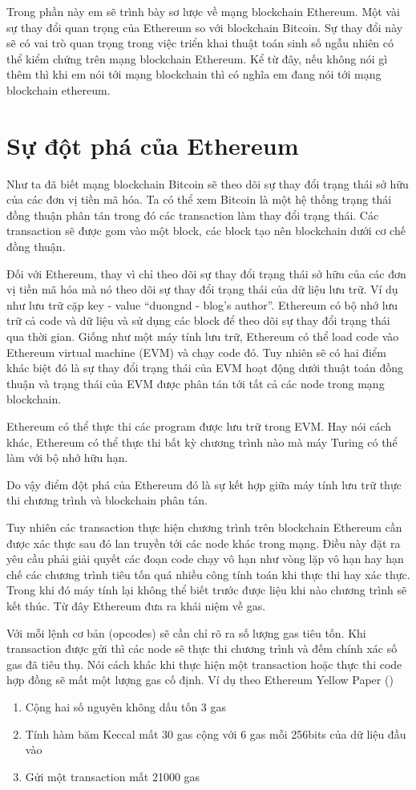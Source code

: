 \documentclass[../main.tex]{subfiles}
\begin{document}
Trong phần này em sẽ trình bày sơ lược về mạng blockchain Ethereum. Một vài sự thay đổi quan trọng của Ethereum so với blockchain Bitcoin. Sự thay đổi này sẽ có vai trò quan trọng trong việc triển khai thuật toán sinh số ngẫu nhiên có thể kiểm chứng trên mạng blockchain Ethereum. Kể từ đây, nếu không nói gì thêm thì khi em nói tới mạng blockchain thì có nghĩa em đang nói tới mạng blockchain ethereum. 

\section{Sự đột phá của Ethereum}
Như ta đã biết mạng blockchain Bitcoin sẽ theo dõi sự thay đổi trạng thái sở hữu của các đơn vị tiền mã hóa. Ta có thể xem Bitcoin là một hệ thống trạng thái đồng thuận phân tán trong đó các transaction  làm thay đổi trạng thái.  Các transaction sẽ được gom vào một block, các block tạo nên blockchain dưới cơ chế đồng thuận.

Đối với Ethereum, thay vì chỉ theo dõi sự thay đổi trạng thái sở hữu của các đơn vị tiền mã hóa mà nó theo dõi sự thay đổi trạng thái của dữ liệu lưu trữ. Ví dụ như lưu trữ cặp key - value “duongnd - blog’s author”.  Ethereum có bộ nhớ lưu trữ cả code và dữ liệu và sử dụng các block để theo dõi sự thay đổi trạng thái qua thời gian. Giống như một máy tính lưu trữ, Ethereum có thể load code vào Ethereum virtual machine (EVM) và chạy code đó. Tuy nhiên sẽ có hai điểm khác biệt đó là sự thay đổi trạng thái của EVM hoạt động dưới thuật toán đồng thuận và trạng thái của EVM được phân tán tới tất cả các node trong mạng blockchain. 

Ethereum có thể thực thi các program được lưu trữ trong EVM. Hay nói cách khác, Ethereum có thể thực thi bất kỳ chương trình nào mà máy Turing có thể làm với bộ nhớ hữu hạn. 

Do vậy điểm đột phá của Ethereum đó là sự kết hợp giữa máy tính lưu trữ thực thi chương trình và blockchain phân tán. 

Tuy nhiên các transaction thực hiện chương trình trên blockchain Ethereum  cần được xác thực sau đó lan truyền tới các node khác trong mạng. Điều này đặt ra yêu cầu phải giải quyết các đoạn code chạy vô hạn như vòng lặp vô hạn hay hạn chế các chương trình tiêu tốn quá nhiều công tính toán khi thực thi hay xác thực. Trong khi đó máy tính lại không thể biết trước được liệu khi nào chương trình sẽ kết thúc. Từ đây Ethereum đưa ra khái niệm về gas.

Với mỗi lệnh cơ bản (opcodes) sẽ cần chỉ rõ ra số lượng gas tiêu tốn. Khi transaction được gửi thì các node sẽ thực thi chương trình và đếm chính xác số gas đã tiêu thụ. Nói cách khác khi thực hiện một transaction hoặc thực thi code hợp đồng sẽ mất một lượng gas cố định. Ví dụ theo Ethereum Yellow Paper (\cite{wood2014ethereum})
\begin{enumerate}
    \item Cộng hai số nguyên không dấu tốn 3 gas
    \item Tính hàm băm Keccal mất 30 gas cộng với 6 gas mỗi 256bits của dữ liệu đầu vào
    \item Gửi một transaction mất 21000 gas
\end{enumerate}
\end{document}
